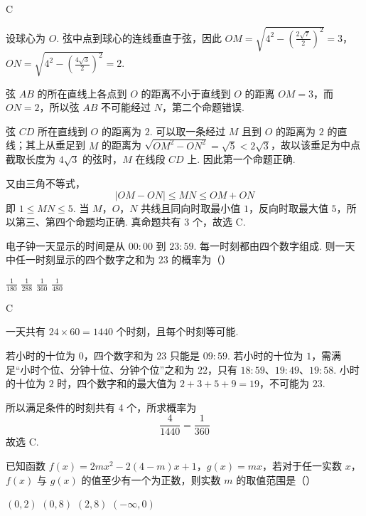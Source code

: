 \begin{answer}
C
\end{answer}

\begin{solution}
设球心为 \(O\). 弦中点到球心的连线垂直于弦，因此
\(OM=\sqrt{4^2-\left(\frac{2\sqrt7}{2}\right)^2}=3\)，\(ON=\sqrt{4^2-\left(\frac{4\sqrt3}{2}\right)^2}=2\).

弦 \(AB\) 的所在直线上各点到 \(O\) 的距离不小于直线到 \(O\) 的距离 \(OM=3\)，而 \(ON=2\)，所以弦 \(AB\) 不可能经过 \(N\)，第二个命题错误.

弦 \(CD\) 所在直线到 \(O\) 的距离为 \(2\). 可以取一条经过 \(M\) 且到 \(O\) 的距离为 \(2\) 的直线；其上从垂足到 \(M\) 的距离为 \(\sqrt{OM^2-ON^2}=\sqrt5<2\sqrt3\)，故以该垂足为中点截取长度为 \(4\sqrt3\) 的弦时，\(M\) 在线段 \(CD\) 上. 因此第一个命题正确.

又由三角不等式，
\[
|OM-ON|\leqslant MN\leqslant OM+ON
\]
即 \(1\leqslant MN\leqslant5\). 当 \(M\)，\(O\)，\(N\) 共线且同向时取最小值 \(1\)，反向时取最大值 \(5\)，所以第三、第四个命题均正确. 真命题共有 3 个，故选 C.
\end{solution}

\begin{problem}
电子钟一天显示的时间是从 \(00{:}00\) 到 \(23{:}59\). 每一时刻都由四个数字组成. 则一天中任一时刻显示的四个数字之和为 \(23\) 的概率为（\quad）

\choices
    {\(\frac{1}{180}\)}
    {\(\frac{1}{288}\)}
    {\(\frac{1}{360}\)}
    {\(\frac{1}{480}\)}
\end{problem}

\begin{answer}
C
\end{answer}

\begin{solution}
一天共有 \(24\times60=1440\) 个时刻，且每个时刻等可能.

若小时的十位为 \(0\)，四个数字和为 \(23\) 只能是 \(09{:}59\). 若小时的十位为 \(1\)，需满足“小时个位、分钟十位、分钟个位”之和为 \(22\)，只有 \(18{:}59\)、\(19{:}49\)、\(19{:}58\). 小时的十位为 \(2\) 时，四个数字和的最大值为 \(2+3+5+9=19\)，不可能为 \(23\).

所以满足条件的时刻共有 4 个，所求概率为
\[
\frac4{1440}=\frac1{360}
\]
故选 C.
\end{solution}

\begin{problem}
已知函数 \( f(x) = 2mx^2 - 2(4 - m)x + 1 \)，\( g(x) = mx \)，若对于任一实数 \( x \)，\( f(x) \) 与 \( g(x) \) 的值至少有一个为正数，则实数 \( m \) 的取值范围是（\quad）

\choices
    {\((0, 2)\)}
    {\((0, 8)\)}
    {\((2, 8)\)}
    {\((-\infty, 0)\)}
\end{problem}


